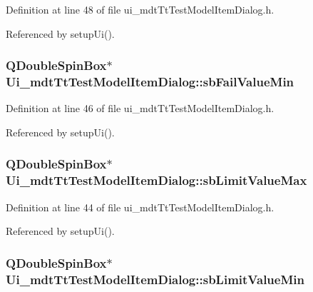 Definition at line 48 of file ui\-\_\-mdt\-Tt\-Test\-Model\-Item\-Dialog.\-h.



Referenced by setup\-Ui().

\hypertarget{class_ui__mdt_tt_test_model_item_dialog_af71bdb2d62648cd941f931fa061fe70f}{
\subsubsection[{sb\-Fail\-Value\-Min}]{\setlength{\rightskip}{0pt plus 5cm}Q\-Double\-Spin\-Box$\ast$ Ui\-\_\-mdt\-Tt\-Test\-Model\-Item\-Dialog\-::sb\-Fail\-Value\-Min}}\label{class_ui__mdt_tt_test_model_item_dialog_af71bdb2d62648cd941f931fa061fe70f}


Definition at line 46 of file ui\-\_\-mdt\-Tt\-Test\-Model\-Item\-Dialog.\-h.



Referenced by setup\-Ui().

\hypertarget{class_ui__mdt_tt_test_model_item_dialog_aab2598753cacf2f117051018aadd9af3}{
\subsubsection[{sb\-Limit\-Value\-Max}]{\setlength{\rightskip}{0pt plus 5cm}Q\-Double\-Spin\-Box$\ast$ Ui\-\_\-mdt\-Tt\-Test\-Model\-Item\-Dialog\-::sb\-Limit\-Value\-Max}}\label{class_ui__mdt_tt_test_model_item_dialog_aab2598753cacf2f117051018aadd9af3}


Definition at line 44 of file ui\-\_\-mdt\-Tt\-Test\-Model\-Item\-Dialog.\-h.



Referenced by setup\-Ui().

\hypertarget{class_ui__mdt_tt_test_model_item_dialog_a13be08211a42b3849150f2628c47d82e}{
\subsubsection[{sb\-Limit\-Value\-Min}]{\setlength{\rightskip}{0pt plus 5cm}Q\-Double\-Spin\-Box$\ast$ Ui\-\_\-mdt\-Tt\-Test\-Model\-Item\-Dialog\-::sb\-Limit\-Value\-Min}}\label{class_ui__mdt_tt_test_model_item_dialog_a13be08211a42b3849150f2628c47d82e}


